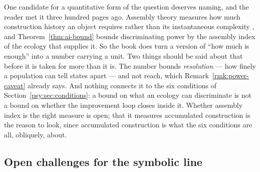 \begin{remark}
\label{psy:rem:assembly}
One candidate for a quantitative form of the question deserves
naming, and the reader met it three hundred pages ago.
Assembly theory measures how much construction history an object
requires rather than its instantaneous complexity
\cite{walker2023}, and Theorem~\ref{thm:ai-bound} bounds
discriminating power by the assembly index of the ecology that
supplies it.
So the book does turn a version of ``how much is enough'' into a
number carrying a unit.
Two things should be said about that before it is taken for more
than it is.
The number bounds \emph{resolution} --- how finely a population can
tell states apart --- and not reach, which
Remark~\ref{rmk:power-caveat} already says.
And nothing connects it to the six conditions of
Section~\ref{psy:sec:conditions}: a bound on what an ecology can
discriminate is not a bound on whether the improvement loop closes
inside it.
Whether assembly index is the right measure is open; that it
measures accumulated construction is the reason to look, since
accumulated construction is what the six conditions are all,
obliquely, about.
\end{remark}

\subsection{Open challenges for the symbolic line}
\label{psy:sec:openchallenges}

